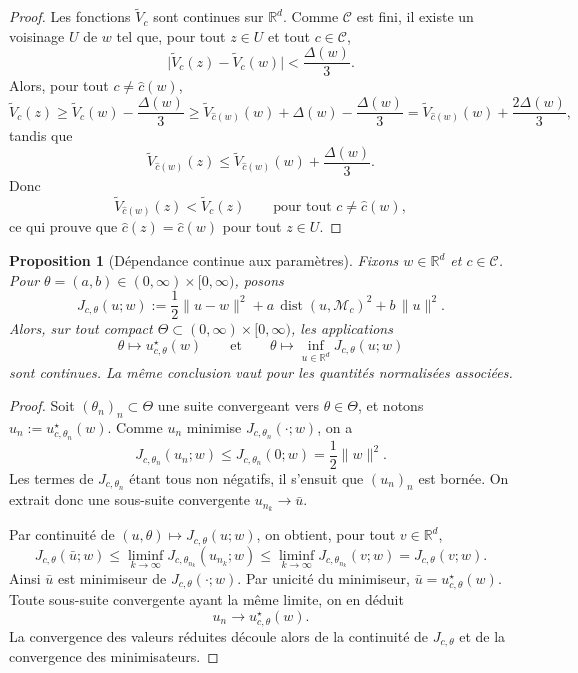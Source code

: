\documentclass[11pt,a4paper]{article}
\newtheorem{proposition}{Proposition}[section]
\DeclareMathOperator{\dist}{dist}
\newcommand{\R}{\mathbb R}
\newcommand{\Mcal}{\mathcal M}
\newcommand{\Ccal}{\mathcal C}
\begin{document}
\begin{proof}
Les fonctions \(\widetilde V_c\) sont continues sur \(\R^d\). Comme \(\Ccal\) est fini, il existe un voisinage \(U\) de \(w\) tel que, pour tout \(z\in U\) et tout \(c\in\Ccal\),
\[
\bigl|\widetilde V_c(z)-\widetilde V_c(w)\bigr|<\frac{\Delta(w)}{3}.
\]
Alors, pour tout \(c\neq \hat c(w)\),
\[
\widetilde V_c(z)
\ge
\widetilde V_c(w)-\frac{\Delta(w)}{3}
\ge
\widetilde V_{\hat c(w)}(w)+\Delta(w)-\frac{\Delta(w)}{3}
=
\widetilde V_{\hat c(w)}(w)+\frac{2\Delta(w)}{3},
\]
tandis que
\[
\widetilde V_{\hat c(w)}(z)
\le
\widetilde V_{\hat c(w)}(w)+\frac{\Delta(w)}{3}.
\]
Donc
\[
\widetilde V_{\hat c(w)}(z)<\widetilde V_c(z)
\qquad\text{pour tout }c\neq \hat c(w),
\]
ce qui prouve que \(\hat c(z)=\hat c(w)\) pour tout \(z\in U\).
\end{proof}

\begin{proposition}[Dépendance continue aux paramètres]
Fixons \(w\in\R^d\) et \(c\in\Ccal\). Pour \(\theta=(a,b)\in(0,\infty)\times[0,\infty)\), posons
\[
J_{c,\theta}(u;w)
:=
\frac12\|u-w\|^2+a\,\dist(u,\Mcal_c)^2+b\,\|u\|^2.
\]
Alors, sur tout compact \(\Theta\subset(0,\infty)\times[0,\infty)\), les applications
\[
\theta\longmapsto u_{c,\theta}^\star(w)
\qquad\text{et}\qquad
\theta\longmapsto \inf_{u\in\R^d}J_{c,\theta}(u;w)
\]
sont continues. La même conclusion vaut pour les quantités normalisées associées.
\end{proposition}

\begin{proof}
Soit \((\theta_n)_n\subset\Theta\) une suite convergeant vers \(\theta\in\Theta\), et notons
\(u_n:=u_{c,\theta_n}^\star(w)\).
Comme \(u_n\) minimise \(J_{c,\theta_n}(\cdot;w)\), on a
\[
J_{c,\theta_n}(u_n;w)\le J_{c,\theta_n}(0;w)=\frac12\|w\|^2.
\]
Les termes de \(J_{c,\theta_n}\) étant tous non négatifs, il s'ensuit que \((u_n)_n\) est bornée.
On extrait donc une sous-suite convergente \(u_{n_k}\to\bar u\).

Par continuité de \((u,\theta)\mapsto J_{c,\theta}(u;w)\), on obtient, pour tout \(v\in\R^d\),
\[
J_{c,\theta}(\bar u;w)
\le
\liminf_{k\to\infty}J_{c,\theta_{n_k}}(u_{n_k};w)
\le
\liminf_{k\to\infty}J_{c,\theta_{n_k}}(v;w)
=
J_{c,\theta}(v;w).
\]
Ainsi \(\bar u\) est minimiseur de \(J_{c,\theta}(\cdot;w)\). Par unicité du minimiseur,
\(\bar u=u_{c,\theta}^\star(w)\). Toute sous-suite convergente ayant la même limite, on en déduit
\[
u_n\to u_{c,\theta}^\star(w).
\]
La convergence des valeurs réduites découle alors de la continuité de \(J_{c,\theta}\) et de la convergence des minimisateurs.
\end{proof}
\end{document}
